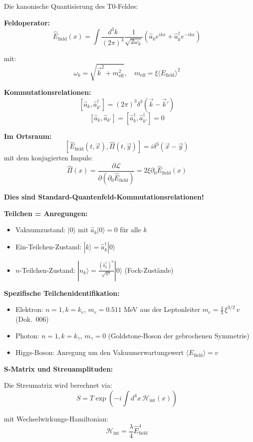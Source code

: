 	Die kanonische Quantisierung des T0-Feldes:
	
	\textbf{Feldoperator:}
	\[
	\hat{E}_{\text{field}}(x) = \int \frac{d^3k}{(2\pi)^3} \frac{1}{\sqrt{2\omega_k}} \left(\hat{a}_k e^{ikx} + \hat{a}^\dagger_k e^{-ikx}\right)
	\]
	
	mit:
	\[
	\omega_k = \sqrt{\vec{k}^2 + m_{\text{eff}}^2}, \quad m_{\text{eff}} = \xi \langle E_{\text{field}} \rangle^2
	\]
	
	\textbf{Kommutationsrelationen:}
	\[
	[\hat{a}_k, \hat{a}^\dagger_{k'}] = (2\pi)^3 \delta^3(\vec{k} - \vec{k}')
	\]
	\[
	[\hat{a}_k, \hat{a}_{k'}] = [\hat{a}^\dagger_k, \hat{a}^\dagger_{k'}] = 0
	\]
	
	\textbf{Im Ortsraum:}
	\[
	[\hat{E}_{\text{field}}(t, \vec{x}), \hat{\Pi}(t, \vec{y})] = i \delta^3(\vec{x} - \vec{y})
	\]
	mit dem konjugierten Impuls:
	\[
	\hat{\Pi}(x) = \frac{\partial \mathcal{L}}{\partial (\partial_0 \hat{E}_{\text{field}})} = 2\xi \partial_0 \hat{E}_{\text{field}}(x)
	\]
	
	\textbf{Dies sind Standard-Quantenfeld-Kommutationsrelationen!}
	
	\textbf{Teilchen = Anregungen:}
	\begin{itemize}
		\item Vakuumzustand: $|0\rangle$ mit $\hat{a}_k |0\rangle = 0$ für alle $k$
		\item Ein-Teilchen-Zustand: $|k\rangle = \hat{a}^\dagger_k |0\rangle$
		\item $n$-Teilchen-Zustand: $|n_k\rangle = \frac{(\hat{a}^\dagger_k)^n}{\sqrt{n!}} |0\rangle$ (Fock-Zustände)
	\end{itemize}
	
	\textbf{Spezifische Teilchenidentifikation:}
	\begin{itemize}
		\item Elektron: $n=1, k=k_e$, $m_e = 0.511$ MeV aus der Leptonleiter $m_e = \frac{4}{3}\,\xi^{3/2}\,v$ (Dok.~006)
		\item Photon: $n=1, k=k_\gamma$, $m_\gamma = 0$ (Goldstone-Boson der gebrochenen Symmetrie)
		\item Higgs-Boson: Anregung um den Vakuumerwartungswert $\langle E_{\text{field}} \rangle = v$
	\end{itemize}
	
	\textbf{S-Matrix und Streuamplituden:}
	
	Die Streumatrix wird berechnet via:
	\[
	S = T \exp\left(-i \int d^4x \, \mathcal{H}_{\text{int}}(x)\right)
	\]
	
	mit Wechselwirkungs-Hamiltonian:
	\[
	\mathcal{H}_{\text{int}} = \frac{\lambda}{4} \hat{E}_{\text{field}}^4
	\]
	
